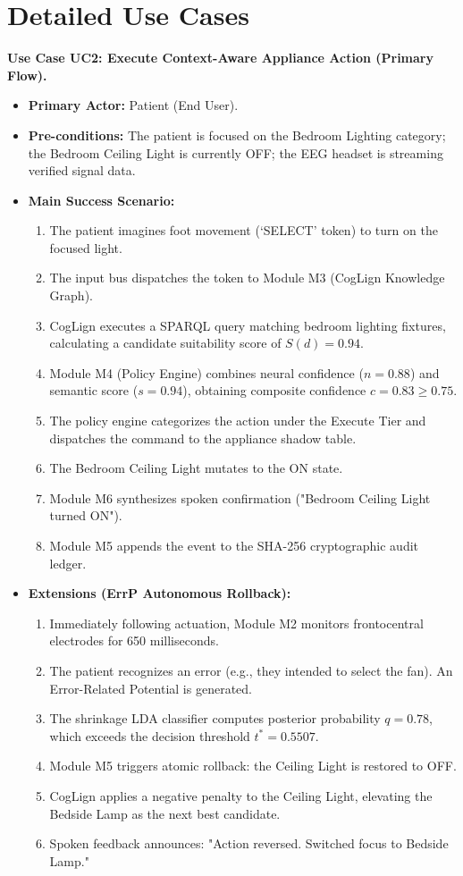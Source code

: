\documentclass[12pt,a4paper]{report}
\begin{document}
\section{Detailed Use Cases}
\textbf{Use Case UC2: Execute Context-Aware Appliance Action (Primary Flow).}
\begin{itemize}[leftmargin=1.5em]
    \item \textbf{Primary Actor:} Patient (End User).
    \item \textbf{Pre-conditions:} The patient is focused on the Bedroom Lighting category; the Bedroom Ceiling Light is currently OFF; the EEG headset is streaming verified signal data.
    \item \textbf{Main Success Scenario:}
    \begin{enumerate}
        \item The patient imagines foot movement (`SELECT' token) to turn on the focused light.
        \item The input bus dispatches the token to Module M3 (CogLign Knowledge Graph).
        \item CogLign executes a SPARQL query matching bedroom lighting fixtures, calculating a candidate suitability score of $S(d) = 0.94$.
        \item Module M4 (Policy Engine) combines neural confidence ($n = 0.88$) and semantic score ($s = 0.94$), obtaining composite confidence $c = 0.83 \ge 0.75$.
        \item The policy engine categorizes the action under the Execute Tier and dispatches the command to the appliance shadow table.
        \item The Bedroom Ceiling Light mutates to the ON state.
        \item Module M6 synthesizes spoken confirmation ("Bedroom Ceiling Light turned ON").
        \item Module M5 appends the event to the SHA-256 cryptographic audit ledger.
    \end{enumerate}
    \item \textbf{Extensions (ErrP Autonomous Rollback):}
    \begin{enumerate}[label=\alph*.]
        \item Immediately following actuation, Module M2 monitors frontocentral electrodes for 650 milliseconds.
        \item The patient recognizes an error (e.g., they intended to select the fan). An Error-Related Potential is generated.
        \item The shrinkage LDA classifier computes posterior probability $q = 0.78$, which exceeds the decision threshold $t^* = 0.5507$.
        \item Module M5 triggers atomic rollback: the Ceiling Light is restored to OFF.
        \item CogLign applies a negative penalty to the Ceiling Light, elevating the Bedside Lamp as the next best candidate.
        \item Spoken feedback announces: "Action reversed. Switched focus to Bedside Lamp."
    \end{enumerate}
\end{itemize}
\end{document}
